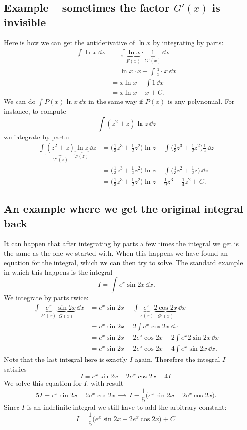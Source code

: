 \subsection{Example -- sometimes the factor $G'(x)$ is invisible} %
Here is how we can get the antiderivative of $\ln x$ by integrating by parts:
\begin{align*}
  \int \ln x\,\dd x
  &= \int \underbrace{\ln x}_{F(x)}\cdot \underbrace{1}_{G'(x)}\,\dd x \\
  &= \ln x\cdot x - \int \frac1x\cdot x\,\dd x \\
  &= x\ln x - \int 1\,\dd x \\
  &= x\ln x -x + C.
\end{align*}
We can do $\int P(x)\ln x\,\dd x$ in the same way if $P(x)$ is any polynomial.
For instance, to compute
\[
\int (z^2+z) \ln z \,\dd z
\]
we integrate by parts:
\begin{align*}
  \int \underbrace{(z^2+z)}_{G'(z)} \underbrace{\ln z}_{F(z)} \,\dd z &=
  \bigl(\tfrac13 z^3 + \tfrac 12 z^2\bigr) \ln z
  - \int  \bigl(\tfrac13 z^3 + \tfrac 12 z^2\bigr) \frac 1 z\, \dd z \\
  &= \bigl(\tfrac13 z^3 + \tfrac 12 z^2\bigr) \ln z
  - \int  \bigl(\tfrac13 z^2 + \tfrac 12 z\bigr)\, \dd z \\
  &= \bigl(\tfrac13 z^3 + \tfrac 12 z^2\bigr) \ln z -\tfrac19 z^3 - \tfrac 14
  z^2 +C.
\end{align*}

\subsection{An example where we get the original integral back} %
It can happen that after integrating by parts a few times the integral we get is
the same as the one we started with.  When this happens we have found an
equation for the integral, which we can then try to solve.  The standard example
in which this happens is the integral
\[
I = \int e^x \sin 2x\, \dd x.
\]
We integrate by parts twice:
\begin{align*}
  \int \underbrace{e^x}_{F'(x)} \underbrace{\sin 2x}_{G(x)}\, \dd x
  & = e^x \sin 2x - \int \underbrace{e^x}_{F(x)} \underbrace{2\cos 2x}_{G'(x)} \, \dd x \\
  &=  e^x \sin 2x - 2 \int e^x \cos 2x \, \dd x \\
  &=  e^x \sin 2x - 2 e^x \cos 2x - 2\int e^x 2\sin 2x\, \dd x \\
  &= e^x \sin 2x - 2 e^x \cos 2x - 4\int e^x \sin 2x\, \dd x .
\end{align*}
Note that the last integral here is exactly $I$ again.  Therefore the integral
$I$ satisfies
\[
I = e^x \sin 2x - 2 e^x \cos 2x - 4I.
\]
We solve this equation for $I$, with result
\[
5I = e^x \sin 2x - 2 e^x \cos 2x \implies I = \frac15\bigl( e^x \sin 2x - 2 e^x
\cos 2x\bigr).
\]
Since $I$ is an indefinite integral we still have to add the arbitrary constant:
\[
I = \frac15\bigl( e^x \sin 2x - 2 e^x \cos 2x\bigr) + C.
\]

